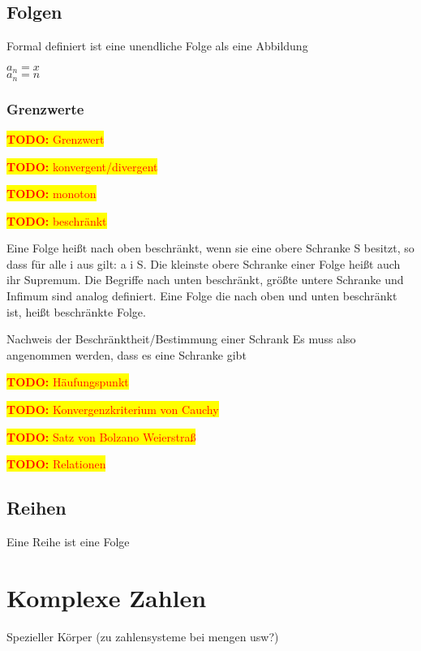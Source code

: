 \documentclass[10pt,a4paper]{article}
\newcommand{\todo}[1]{\begin{flushleft} \colorbox{yellow}{\textcolor{red}{\textbf{TODO:} {#1}}}\end{flushleft} }
\begin{document}
\subsection{Folgen}

	Formal definiert ist eine unendliche Folge als eine Abbildung

	$a_n = x$\\
	$a_n = n$
	
	\subsubsection{Grenzwerte}
	\todo{Grenzwert}
		
		
	
		
	\todo{konvergent/divergent}
	\todo{monoton}
	\todo{beschränkt}
	Eine Folge heißt nach oben beschränkt, wenn sie eine obere
	 Schranke S besitzt, so dass für alle i aus  gilt: a i S. Die
	  kleinste obere Schranke einer Folge heißt auch ihr Supremum.
	   Die Begriffe nach unten beschränkt, größte untere Schranke 
	   und Infimum sind analog definiert. Eine Folge die nach oben
	    und unten beschränkt ist, heißt beschränkte Folge.
		
	Nachweis der Beschränktheit/Bestimmung einer Schrank
	Es muss also angenommen werden, dass es eine Schranke gibt
	
	
	\todo{Häufungspunkt}
	
	\todo{Konvergenzkriterium von Cauchy}
	\todo{Satz von Bolzano Weierstraß}

\todo{Relationen}

\subsection{Reihen}
	Eine Reihe ist eine Folge


\section{Komplexe Zahlen}
Spezieller Körper (zu zahlensysteme bei mengen usw?)
\end{document}
